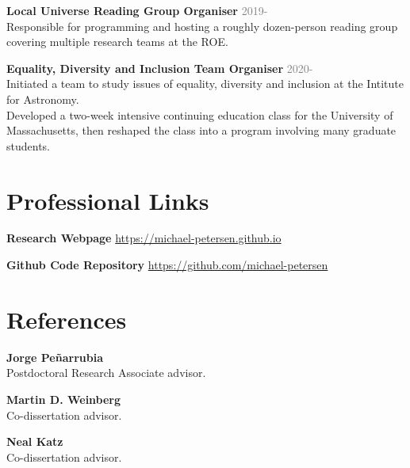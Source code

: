 \documentclass[margin, 11pt]{res} %
\begin{document}
\begin{resume}
{\bf Local Universe Reading Group Organiser} \hfill\textcolor{grey}{2019-}\\
Responsible for programming and hosting a roughly dozen-person reading
group covering multiple research teams at the ROE.

{\bf Equality, Diversity and Inclusion Team Organiser} \hfill\textcolor{grey}{2020-}\\
Initiated a team to study issues of equality, diversity and inclusion at the Intitute for Astronomy.\\




Developed a two-week intensive continuing education class for the University of Massachusetts, then reshaped the class into a program involving many graduate students.

%


\section{\sc \textcolor{redshade}{Professional Links}}
{\bf Research Webpage} \url{https://michael-petersen.github.io}

{\bf Github Code Repository} \url{https://github.com/michael-petersen}


\section{\sc \textcolor{redshade}{References}}

{\bf Jorge Pe{\~n}arrubia}\\
Postdoctoral Research Associate advisor.

{\bf Martin D. Weinberg}\\
Co-dissertation advisor.

{\bf Neal Katz}\\
Co-dissertation advisor.


\end{resume}
\end{document}
